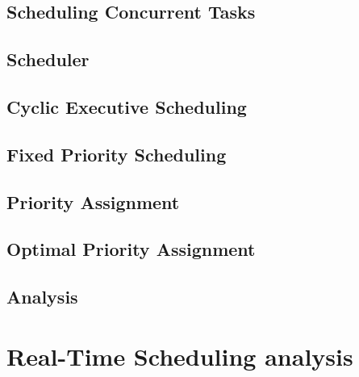 \subsection{Scheduling Concurrent Tasks}

\subsection{Scheduler}

\subsection{Cyclic Executive Scheduling}
\subsection{Fixed Priority Scheduling}
\subsection{Priority Assignment}
\subsection{Optimal Priority Assignment}
\subsection{Analysis}

\section{Real-Time Scheduling analysis}